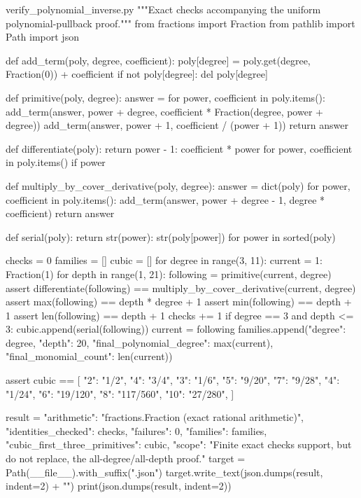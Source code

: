 \begin{filecontents*}[overwrite]{verify_polynomial_inverse.py}
"""Exact checks accompanying the uniform polynomial-pullback proof."""
from fractions import Fraction
from pathlib import Path
import json


def add_term(poly, degree, coefficient):
    poly[degree] = poly.get(degree, Fraction(0)) + coefficient
    if not poly[degree]:
        del poly[degree]


def primitive(poly, degree):
    answer = {}
    for power, coefficient in poly.items():
        add_term(answer, power + degree,
                 coefficient * Fraction(degree, power + degree))
        add_term(answer, power + 1, coefficient / (power + 1))
    return answer


def differentiate(poly):
    return {power - 1: coefficient * power
            for power, coefficient in poly.items() if power}


def multiply_by_cover_derivative(poly, degree):
    answer = dict(poly)
    for power, coefficient in poly.items():
        add_term(answer, power + degree - 1, degree * coefficient)
    return answer


def serial(poly):
    return {str(power): str(poly[power]) for power in sorted(poly)}


checks = 0
families = []
cubic = []
for degree in range(3, 11):
    current = {1: Fraction(1)}
    for depth in range(1, 21):
        following = primitive(current, degree)
        assert differentiate(following) == multiply_by_cover_derivative(current, degree)
        assert max(following) == depth * degree + 1
        assert min(following) == depth + 1
        assert len(following) == depth + 1
        checks += 1
        if degree == 3 and depth <= 3:
            cubic.append(serial(following))
        current = following
    families.append({"degree": degree, "depth": 20,
                     "final_polynomial_degree": max(current),
                     "final_monomial_count": len(current)})

assert cubic == [
    {"2": "1/2", "4": "3/4"},
    {"3": "1/6", "5": "9/20", "7": "9/28"},
    {"4": "1/24", "6": "19/120", "8": "117/560", "10": "27/280"},
]

result = {"arithmetic": "fractions.Fraction (exact rational arithmetic)",
          "identities_checked": checks, "failures": 0,
          "families": families, "cubic_first_three_primitives": cubic,
          "scope": "Finite exact checks support, but do not replace, the all-degree/all-depth proof."}
target = Path(__file__).with_suffix(".json")
target.write_text(json.dumps(result, indent=2) + "\n")
print(json.dumps(result, indent=2))
\end{filecontents*}
